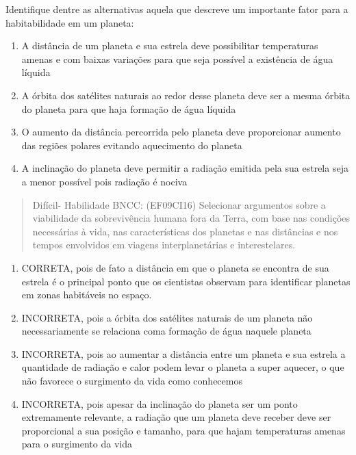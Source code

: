 Identifique dentre as alternativas aquela que descreve um importante
fator para a habitabilidade em um planeta:

\begin{enumerate}
\def\labelenumi{(\Alph{enumi})}
\item
  A distância de um planeta e sua estrela deve possibilitar temperaturas
  amenas e com baixas variações para que seja possível a existência de
  água líquida
\item
  A órbita dos satélites naturais ao redor desse planeta deve ser a
  mesma órbita do planeta para que haja formação de água líquida
\item
  O aumento da distância percorrida pelo planeta deve proporcionar
  aumento das regiões polares evitando aquecimento do planeta
\item
  A inclinação do planeta deve permitir a radiação emitida pela sua
  estrela seja a menor possível pois radiação é nociva
\end{enumerate}

\begin{quote}
Difícil- Habilidade BNCC: (EF09CI16) Selecionar argumentos sobre a
viabilidade da sobrevivência humana fora da Terra, com base nas
condições necessárias à vida, nas características dos planetas e nas
distâncias e nos tempos envolvidos em viagens interplanetárias e
interestelares.
\end{quote}

\begin{enumerate}
\def\labelenumi{(\Alph{enumi})}
\item
  CORRETA, pois de fato a distância em que o planeta se encontra de sua
  estrela é o principal ponto que os cientistas observam para
  identificar planetas em zonas habitáveis no espaço.
\item
  INCORRETA, pois a órbita dos satélites naturais de um planeta não
  necessariamente se relaciona coma formação de água naquele planeta
\item
  INCORRETA, pois ao aumentar a distância entre um planeta e sua estrela
  a quantidade de radiação e calor podem levar o planeta a super
  aquecer, o que não favorece o surgimento da vida como conhecemos
\item
  INCORRETA, pois apesar da inclinação do planeta ser um ponto
  extremamente relevante, a radiação que um planeta deve receber deve
  ser proporcional a sua posição e tamanho, para que hajam temperaturas
  amenas para o surgimento da vida
\end{enumerate}

